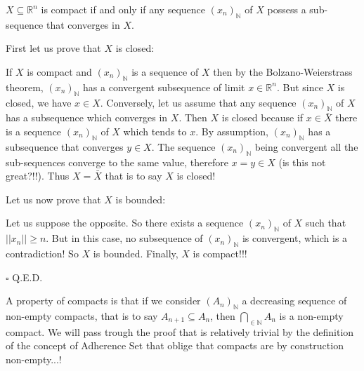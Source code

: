 	\begin{theorem}
	$X\subseteq \mathbb{R}^n$ is compact if and only if any sequence $(x_n)_\mathbb{N}$ of $X$ possess a sub-sequence that converges in $X$.
	\end{theorem}
	\begin{dem}
	First let us prove that $X$ is closed:
	
	If $X$ is compact and $(x_n)_\mathbb{N}$ is a sequence of $X$ then by the Bolzano-Weierstrass theorem, $(x_n)_\mathbb{N}$  has a convergent subsequence of limit $x\in \mathbb{R}^n$. But since $X$ is closed, we have $x\in X$. Conversely, let us assume that any sequence $(x_n)_\mathbb{N}$  of $X$ has a subsequence which converges in $X$. Then $X$ is closed because if $x\in \bar{X}$ there is a sequence $(x_n)_\mathbb{N}$ of $X$ which tends to $x$. By assumption, $(x_n)_\mathbb{N}$ has a subsequence that converges $y\in X$. The sequence $(x_n)_\mathbb{N}$ being convergent all the sub-sequences converge to the same value, therefore $x=y\in X$ (is this not great?!!). Thus $X=\bar{X}$ that is to say $X$ is closed!
	
	Let us now prove that $X$ is bounded:
	
	Let us suppose the opposite. So there exists a sequence $(x_n)_\mathbb{N}$ of $X$ such that $||x_n||\geq n$. But in this case, no subsequence of $(x_n)_\mathbb{N}$ is convergent, which is a contradiction! So $X$ is bounded. Finally, $X$ is compact!!!
	\begin{flushright}
		$\square$  Q.E.D.
	\end{flushright}
	\end{dem}
	A property of compacts is that if we consider $(A_n)_\mathbb{N}$ a decreasing sequence of non-empty compacts, that is to say $A_{n+1}\subseteq A_n$, then $\bigcap_{\in \mathbb{N}} A_n$ is a non-empty compact. We will pass trough the proof that is relatively trivial by the definition of the concept of Adherence Set that oblige that compacts are by construction non-empty...!
